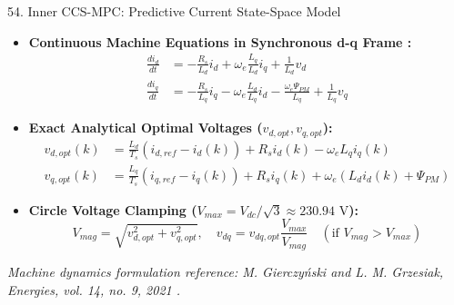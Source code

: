 \documentclass[aspectratio=169]{beamer}
\begin{document}
\begin{frame}{54. Inner CCS-MPC: Predictive Current State-Space Model}
    \begin{itemize}
        \footnotesize
        \setlength{\itemsep}{2pt}
        \item \textbf{Continuous Machine Equations in Synchronous d-q Frame \cite{10}:}
        \begin{align}
            \frac{di_d}{dt} &= -\frac{R_s}{L_d} i_d + \omega_e \frac{L_q}{L_d} i_q + \frac{1}{L_d} v_d \\
            \frac{di_q}{dt} &= -\frac{R_s}{L_q} i_q - \omega_e \frac{L_d}{L_q} i_d - \frac{\omega_e \Psi_{PM}}{L_q} + \frac{1}{L_q} v_q
        \end{align}
        \item \textbf{Exact Analytical Optimal Voltages ($v_{d,opt}, v_{q,opt}$):}
        \begin{align}
            v_{d,opt}(k) &= \frac{L_d}{T_s} \left( i_{d,ref} - i_d(k) \right) + R_s i_d(k) - \omega_e L_q i_q(k) \\
            v_{q,opt}(k) &= \frac{L_q}{T_s} \left( i_{q,ref} - i_q(k) \right) + R_s i_q(k) + \omega_e \left( L_d i_d(k) + \Psi_{PM} \right)
        \end{align}
        \item \textbf{Circle Voltage Clamping ($V_{max} = V_{dc}/\sqrt{3} \approx 230.94\text{ V}$):}
        \begin{equation}
            V_{mag} = \sqrt{v_{d,opt}^2 + v_{q,opt}^2}, \quad v_{dq} = v_{dq,opt} \frac{V_{max}}{V_{mag}} \quad (\text{if } V_{mag} > V_{max})
        \end{equation}
    \end{itemize}
    \vspace{1mm}
    \centering
    \tiny \textit{Machine dynamics formulation reference: M. Gierczy\'nski and L. M. Grzesiak, Energies, vol. 14, no. 9, 2021 \cite{10}.}
\end{frame}
\end{document}
